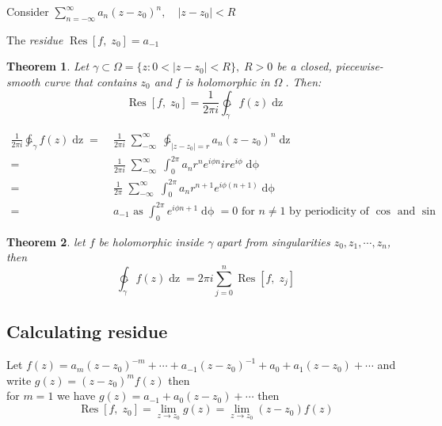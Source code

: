 \documentclass{article}
\newtheorem{theorem}{Theorem}[section]
\newenvironment{proof}[1][Proof]{\begin{trivlist}
\item[\hskip \labelsep {\bfseries #1}]}{\end{trivlist}}
\newenvironment{definition}[1][Definition]{\begin{trivlist}
\item[\hskip \labelsep {\bfseries #1}]}{\end{trivlist}}
\newcommand{\OO}{$ \Omega \;$}
\newcommand{\GG}{$ \gamma \;$}
\newcommand{\SumII}{\sum_{n = -\infty}^\infty}
\newcommand{\LSeries}{\SumII a_n(z-z_0)^n}
\newcommand{\Res}[2]{\mathop{Res} \left[ #1, \; #2 \right]}
\begin{document}
Consider $\LSeries, \quad |z-z_0| < R$
\begin{definition}
    The \textit{residue} $\Res{f}{z_0} = a_{-1}$
\end{definition}

\begin{theorem}
    Let $\gamma \subset \Omega = \{z: 0 < |z-z_0| < R \}, \; R > 0$ be a closed, piecewise-smooth curve that contains
    $z_0$ and $f$ is holomorphic in \OO. Then:
    \[\Res{f}{z_0} = \frac{1}{2\pi i} \ointctrclockwise_\gamma f(z) \mathop{dz}\]
\end{theorem}

\begin{proof}
    \begin{align*}
        \frac{1}{2\pi i}\ointctrclockwise_\gamma f(z) \mathop{dz} =& \; \frac{1}{2\pi i} \;\sum_{-\infty}^{\infty} \;\ointctrclockwise_{|z-z_0| = r} a_n(z-z_0)^n \mathop{dz}\\
                                                                  =& \; \frac{1}{2\pi i} \;\sum_{-\infty}^{\infty} \;\int_0^{2\pi} a_n r^n e^{i\phi n} i r e^{i\phi}\mathop{d\phi}\\
                                                                  =& \; \frac{1}{2\pi} \;\sum_{-\infty}^{\infty} \;\int_0^{2\pi} a_n r^{n + 1} e^{i\phi(n + 1)} \mathop{d\phi}\\
                                                                  =& \; a_{-1} \text{ as } \int_0^{2\pi} e^{i\phi n+1} \mathop{d\phi} = 0 \text{ for } n \neq 1 \text{ by periodicity of } \cos \text{ and } \sin
    \end{align*}
\end{proof}

\begin{theorem}
    let $f$ be holomorphic inside \GG apart from singularities $z_0, z_1, \cdots, z_n$, then
    \[\ointctrclockwise_\gamma f(z) \mathop{dz} = 2\pi i \sum_{j = 0}^n \Res{f}{z_j}\]
\end{theorem}

\subsection*{Calculating residue}
Let $f(z) = a_m(z-z_0)^{-m} + \cdots + a_{-1}(z - z_0)^{-1} + a_0 + a_1(z-z_0) + \cdots$ and write
$g(z) = (z-z_0)^m f(z)$ then\\

for $m = 1$ we have $g(z) = a_{-1} + a_0(z-z_0) + \cdots$ then 
\[\Res{f}{z_0} = \lim_{z \rightarrow z_0} g(z) = \lim_{z \rightarrow z_0} (z-z_0)f(z) \]
\end{document}
